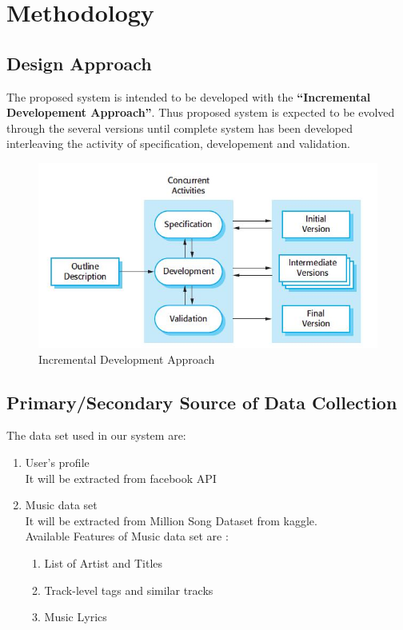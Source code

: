 \documentclass{article}
\begin{document}
\section{Methodology}

\subsection{Design Approach}
The proposed system is intended to be developed with the \textbf{``Incremental Developement Approach''}. Thus proposed system is expected to be evolved through the several versions until complete system has been developed interleaving the activity of specification, developement and validation.
\begin{figure}[ht!]
  \centering
  \includegraphics[width=450px]{figs/incremental.jpg}
  \caption{Incremental Development Approach \label{fig:incremental}}
\end{figure}

\subsection{Primary/Secondary Source of Data Collection}
The data set used in our system are:
\begin{enumerate}
\item User's profile\\
  It will be extracted from facebook API
\item Music data set\\
  It will be extracted from Million Song Dataset from kaggle. \\
  Available Features of Music data set are :
  \begin{enumerate}
  \item List of Artist and Titles
  \item Track-level tags and similar tracks
  \item Music Lyrics
  \end{enumerate}
\end{enumerate}
\end{document}
